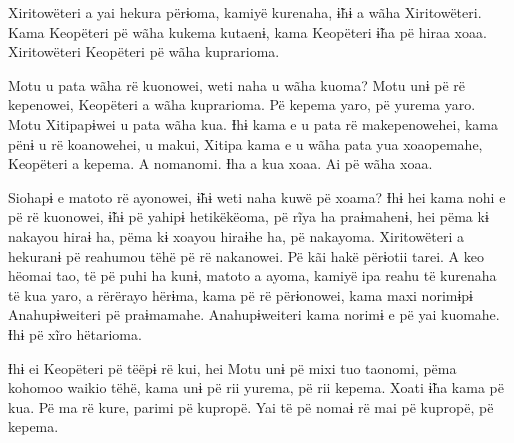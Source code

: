  

 

Xiritowëteri a yai hekura përɨoma, kamiyë kurenaha, ɨ̃hɨ a wãha
Xiritowëteri. Kama Keopëteri pë wãha kukema kutaenɨ, kama Keopëteri ɨ̃ha
pë hiraa xoaa. Xiritowëteri Keopëteri pë wãha kuprarioma.

Motu u pata wãha rë kuonowei, weti naha u wãha kuoma? Motu unɨ pë rë
kepenowei, Keopëteri a wãha kuprarioma. Pë kepema yaro, pë yurema yaro.
Motu Xitipapɨwei u pata wãha kua. Ɨhɨ kama e u pata rë makepenowehei,
kama pënɨ u rë koanowehei, u makui, Xitipa kama e u wãha pata yua
xoaopemahe, Keopëteri a kepema. A nomanomi. Ɨha a kua xoaa. Ai pë wãha
xoaa. 

Siohapɨ e matoto rë ayonowei, ɨ̃hɨ weti naha kuwë pë xoama? Ɨhɨ hei kama
nohi e pë rë kuonowei, ɨ̃hɨ pë yahipɨ hetikëkëoma, pë rĩya ha praɨmahenɨ,
hei pëma kɨ nakayou hiraɨ ha, pëma kɨ xoayou hiraɨhe ha, pë nakayoma.
Xiritowëteri a hekuranɨ pë reahumou tëhë pë rë nakanowei. Pë kãi hakë
përɨotii tarei. A keo hëomai tao, të pë puhi ha kunɨ, matoto a ayoma,
kamiyë ipa reahu të kurenaha të kua yaro, a rërërayo hërɨma, kama pë rë
përɨonowei, kama maxi norimɨpɨ Anahupɨweiteri pë praɨmamahe.
Anahupɨweiteri kama norimɨ e pë yai kuomahe. Ɨhɨ pë xĩro hëtarioma. 

Ɨhɨ ei Keopëteri pë tëëpɨ rë kui, hei Motu unɨ pë mixi tuo taonomi, pëma
kohomoo waikio tëhë, kama unɨ pë rii yurema, pë rii kepema. Xoati ɨ̃ha
kama pë kua. Pë ma rë kure, parimi pë kupropë. Yai të pë nomaɨ rë mai pë
kupropë, pë kepema. 

 
